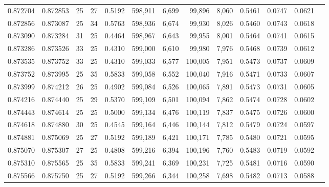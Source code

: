 \begin{tabular}{rrrrrrrrrrrrr}
0.872704 & 0.872853 &    25 &  27 &                                     0.5192 & 598,911 &   6,699 &  99,896 &   8,060 & 0.5461 & 0.0747 & 0.0621 \\
0.872856 & 0.873087 &    25 &  34 &                                     0.5763 & 598,936 &   6,674 &  99,930 &   8,026 & 0.5460 & 0.0743 & 0.0618 \\
0.873090 & 0.873284 &    31 &  25 &                                     0.4464 & 598,967 &   6,643 &  99,955 &   8,001 & 0.5464 & 0.0741 & 0.0615 \\
0.873286 & 0.873526 &    33 &  25 &                                     0.4310 & 599,000 &   6,610 &  99,980 &   7,976 & 0.5468 & 0.0739 & 0.0612 \\
0.873535 & 0.873752 &    33 &  25 &                                     0.4310 & 599,033 &   6,577 & 100,005 &   7,951 & 0.5473 & 0.0737 & 0.0609 \\
0.873752 & 0.873995 &    25 &  35 &                                     0.5833 & 599,058 &   6,552 & 100,040 &   7,916 & 0.5471 & 0.0733 & 0.0607 \\
0.873999 & 0.874212 &    26 &  25 &                                     0.4902 & 599,084 &   6,526 & 100,065 &   7,891 & 0.5473 & 0.0731 & 0.0605 \\
0.874216 & 0.874440 &    25 &  29 &                                     0.5370 & 599,109 &   6,501 & 100,094 &   7,862 & 0.5474 & 0.0728 & 0.0602 \\
0.874443 & 0.874614 &    25 &  25 &                                     0.5000 & 599,134 &   6,476 & 100,119 &   7,837 & 0.5475 & 0.0726 & 0.0600 \\
0.874618 & 0.874880 &    30 &  25 &                                     0.4545 & 599,164 &   6,446 & 100,144 &   7,812 & 0.5479 & 0.0724 & 0.0597 \\
0.874881 & 0.875069 &    25 &  27 &                                     0.5192 & 599,189 &   6,421 & 100,171 &   7,785 & 0.5480 & 0.0721 & 0.0595 \\
0.875070 & 0.875307 &    27 &  25 &                                     0.4808 & 599,216 &   6,394 & 100,196 &   7,760 & 0.5483 & 0.0719 & 0.0592 \\
0.875310 & 0.875565 &    25 &  35 &                                     0.5833 & 599,241 &   6,369 & 100,231 &   7,725 & 0.5481 & 0.0716 & 0.0590 \\
0.875566 & 0.875750 &    25 &  27 &                                     0.5192 & 599,266 &   6,344 & 100,258 &   7,698 & 0.5482 & 0.0713 & 0.0588 \\

\end{tabular}
